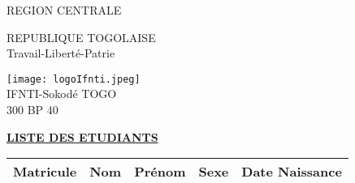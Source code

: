 \documentclass[10pt,a4paper]{article}
\begin{document}
\begin{minipage}{12cm}
\textsf{REGION CENTRALE} \\ \hspace{1cm}
\end{minipage}
\begin{minipage}{5cm}
REPUBLIQUE TOGOLAISE\\
Travail-Liberté-Patrie
\end{minipage}
\begin{minipage}{3cm}
\begin{center}
\texttt{[image: logoIfnti.jpeg]} \\ \hspace{1cm}
IFNTI-Sokodé TOGO\\300 BP 40
\end{center}
\end{minipage}
\begin{center}
\underline{\textbf{LISTE DES ETUDIANTS}}
\end{center}
\begin{longtable}{|l|l|l|l|l|} \hline
\textbf{Matricule} & \textbf{Nom} & \textbf{Prénom} &
\textbf{Sexe} & \textbf{Date Naissance}\\ \hline

\end{longtable}
\end{document}
